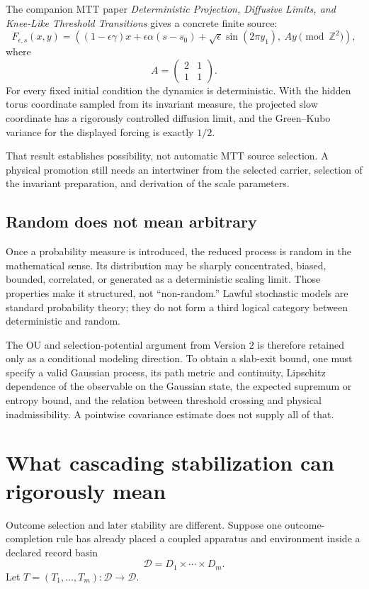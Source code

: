 \documentclass[11pt]{article}
\begin{document}
The companion MTT paper
\emph{Deterministic Projection, Diffusive Limits, and Knee-Like Threshold
Transitions} gives a concrete finite source:
\[
F_{\epsilon,s}(x,y)
=
\left(
(1-\epsilon\gamma)x
+\epsilon\alpha(s-s_0)
+\sqrt{\epsilon}\sin(2\pi y_1),
\ Ay\!\!\pmod{\mathbb Z^2}
\right),
\]
where
\[
A=
\begin{pmatrix}
2&1\\
1&1
\end{pmatrix}.
\]
For every fixed initial condition the dynamics is deterministic. With the
hidden torus coordinate sampled from its invariant measure, the projected
slow coordinate has a rigorously controlled diffusion limit, and the
Green--Kubo variance for the displayed forcing is exactly \(1/2\).

That result establishes possibility, not automatic MTT source selection. A
physical promotion still needs an intertwiner from the selected carrier,
selection of the invariant preparation, and derivation of the scale
parameters.

\subsection*{Random does not mean arbitrary}

Once a probability measure is introduced, the reduced process is random in
the mathematical sense. Its distribution may be sharply concentrated,
biased, bounded, correlated, or generated as a deterministic scaling limit.
Those properties make it structured, not ``non-random.'' Lawful stochastic
models are standard probability theory; they do not form a third logical
category between deterministic and random.

The OU and selection-potential argument from Version 2 is therefore retained
only as a conditional modeling direction. To obtain a slab-exit bound, one
must specify a valid Gaussian process, its path metric and continuity,
Lipschitz dependence of the observable on the Gaussian state, the expected
supremum or entropy bound, and the relation between threshold crossing and
physical inadmissibility. A pointwise covariance estimate does not supply all
of that.

\section{What cascading stabilization can rigorously mean}

Outcome selection and later stability are different. Suppose one
outcome-completion rule has already placed a coupled apparatus and environment
inside a declared record basin
\[
\mathcal D=D_1\times\cdots\times D_m.
\]
Let \(T=(T_1,\ldots,T_m):\mathcal D\to\mathcal D\).
\end{document}
